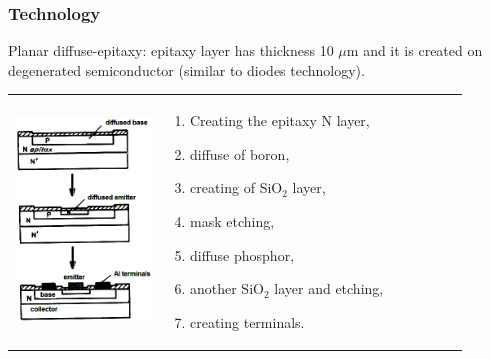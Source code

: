 \documentclass{beamer}
\begin{document}
	\begin{frame}
    \frametitle{Technology}
		Planar diffuse-epitaxy: epitaxy layer has thickness 10 $\mu$m and it is created on degenerated semiconductor (similar to diodes technology).
		\begin{tabular}{m{0.3\linewidth} m{0.6\linewidth}}
		\begin{center}
			\includegraphics[scale=0.35]{obr14_npnTechnology.png} 
		\end{center} &
		
		\begin{enumerate}
			\item Creating the epitaxy N layer,
			\item diffuse of boron,
			\item creating of SiO$_2$ layer,
			\item mask etching,
			\item diffuse phosphor,
			\item another SiO$_2$ layer and etching,
			\item creating terminals.
		\end{enumerate}
		 
		\end{tabular}
	\end{frame}
\end{document}
